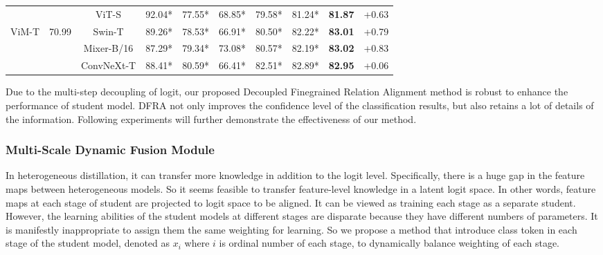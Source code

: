 \begin{table*}[t]
{\begin{tabular}{@{}cccccccccc@{}}
                     &              & ViT-S         & 92.04*       & 77.55*     & 68.85*     & 79.58*     & 81.24* & \textbf{81.87}  & {\color[HTML]{FF0000} +0.63} \\
ViM-T                & 70.99        & Swin-T        & 89.26*       & 78.53*     & 66.91*     & 80.50*      & 82.22* & \textbf{83.01}  & {\color[HTML]{FF0000} +0.79} \\
                     &              & Mixer-B/16    & 87.29*       & 79.34*     & 73.08*     & 80.57*     & 82.19* & \textbf{83.02}  & {\color[HTML]{FF0000} +0.83} \\
                     &              & ConvNeXt-T    & 88.41*       &  80.59*     &  66.41*     & 82.51*     & 82.89* & \textbf{82.95}  & {\color[HTML]{FF0000} +0.06} \\ \bottomrule
\end{tabular}%
}
\vspace{-4mm}
\end{table*}

Due to the multi-step decoupling of logit, our proposed Decoupled Finegrained Relation Alignment method is robust to enhance the performance of student model. DFRA not only improves the confidence level of the classification results, but also retains a lot of details of the information. Following experiments will further demonstrate the effectiveness of our method.
\subsubsection{Multi-Scale Dynamic Fusion Module}
\label{sec:MSDFM}
In heterogeneous distillation, it can transfer more knowledge in addition to the logit level. Specifically, there is a huge gap in the feature maps between heterogeneous models. So it seems feasible to transfer feature-level knowledge in a latent logit space. In other words, feature maps at each stage of student are projected to logit space to be aligned. It can be viewed as training each stage as a separate student. However, the learning abilities of the student models at different stages are disparate because they have different numbers of parameters. It is manifestly inappropriate to assign them the same weighting for learning. So we propose a method that introduce class token in each stage of the student model, denoted as $x_{i}$ where $i$ is ordinal number of each stage, to dynamically balance weighting of each stage.

